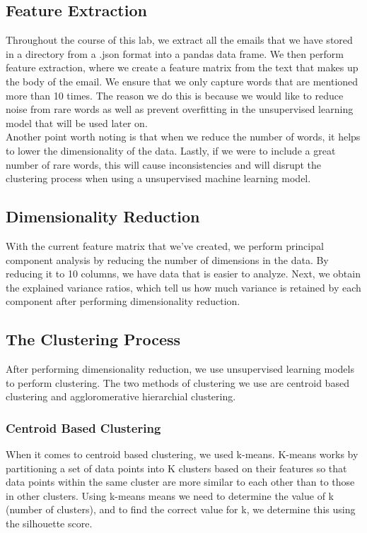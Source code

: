 \documentclass[a4paper, twocolumn]{article}
\begin{document}
\subsection{Feature Extraction}
Throughout the course of this lab, we extract all the emails that we have stored in a directory from a .json format into a pandas data frame. We then 
perform feature extraction, where we create a feature matrix from the text that makes up the body of the email. We ensure that we only capture words that are
mentioned more than 10 times. The reason we do this is because we would like to reduce noise from rare words as well as prevent overfitting in the 
unsupervised learning model that will be used later on. \\

\noindent Another point worth noting is that when we reduce the number of words, it helps to lower the dimensionality of the data. Lastly, if we were to
include a great number of rare words, this will cause inconsistencies and will disrupt the clustering process when using a unsupervised machine learning
model.

\subsection{Dimensionality Reduction}
With the current feature matrix that we've created, we perform principal component analysis by reducing the number of dimensions in the data. By reducing it
to 10 columns, we have data that is easier to analyze. Next, we obtain the explained variance ratios, which tell us how much variance is retained by each
component after performing dimensionality reduction. 

\subsection{The Clustering Process}
After performing dimensionality reduction, we use unsupervised learning models to perform clustering. The two methods of clustering we use are centroid based
clustering and aggloromerative hierarchial clustering. 

\subsubsection{Centroid Based Clustering}
When it comes to centroid based clustering, we used k-means. K-means works by partitioning a set of data points into K clusters based on their features so 
that data points within the same cluster are more similar to each other than to those in other clusters. Using k-means means we need to determine the value 
of k (number of clusters), and to find the correct value for k, we determine this using the silhouette score.
\end{document}

